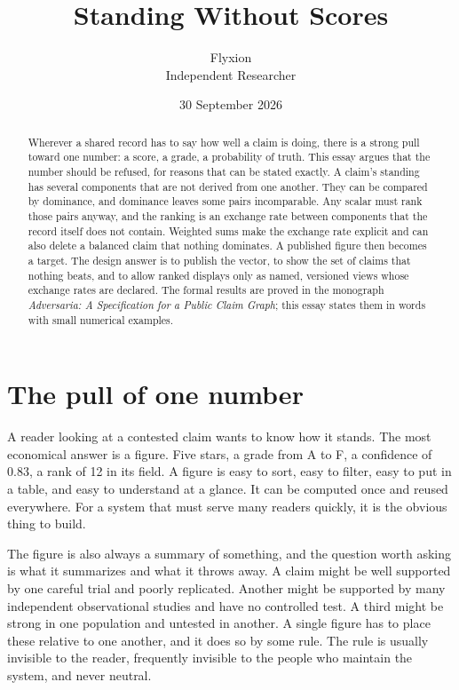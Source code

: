 \documentclass[11pt]{article}
\title{Standing Without Scores}
\author{Flyxion\\\small Independent Researcher}
\date{30 September 2026}
\begin{document}
\maketitle

\begin{abstract}
\noindent
Wherever a shared record has to say how well a claim is doing, there is a strong pull toward one number: a score, a grade, a probability of truth. This essay argues that the number should be refused, for reasons that can be stated exactly. A claim's standing has several components that are not derived from one another. They can be compared by dominance, and dominance leaves some pairs incomparable. Any scalar must rank those pairs anyway, and the ranking is an exchange rate between components that the record itself does not contain. Weighted sums make the exchange rate explicit and can also delete a balanced claim that nothing dominates. A published figure then becomes a target. The design answer is to publish the vector, to show the set of claims that nothing beats, and to allow ranked displays only as named, versioned views whose exchange rates are declared. The formal results are proved in the monograph \emph{Adversaria: A Specification for a Public Claim Graph}; this essay states them in words with small numerical examples.
\end{abstract}

\section{The pull of one number}

A reader looking at a contested claim wants to know how it stands. The most economical answer is a figure. Five stars, a grade from A to F, a confidence of 0.83, a rank of 12 in its field. A figure is easy to sort, easy to filter, easy to put in a table, and easy to understand at a glance. It can be computed once and reused everywhere. For a system that must serve many readers quickly, it is the obvious thing to build.

The figure is also always a summary of something, and the question worth asking is what it summarizes and what it throws away. A claim might be well supported by one careful trial and poorly replicated. Another might be supported by many independent observational studies and have no controlled test. A third might be strong in one population and untested in another. A single figure has to place these relative to one another, and it does so by some rule. The rule is usually invisible to the reader, frequently invisible to the people who maintain the system, and never neutral.
\end{document}
